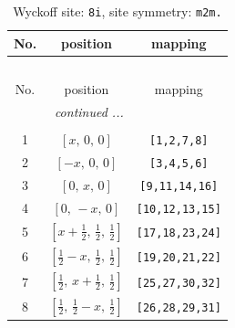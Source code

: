 \documentclass[fleqn,8pt]{jsarticle}
\begin{document}
\begin{longtable}{ccc}
\caption{Wyckoff site: {\tt 8i}, site symmetry: {\tt m2m.}}
 \\
 \hline \hline
No. & position & mapping \\ \hline \endfirsthead

\multicolumn{2}{l}{\tablename\ \thetable{}} \\
 \hline \hline
No. & position & mapping \\ \hline \endhead

 \hline \hline
\multicolumn{2}{r}{\footnotesize\it continued ...} \\ \endfoot

 \hline \hline
\multicolumn{2}{r}{} \\ \endlastfoot

1 & $\left[ x,\, 0,\, 0 \right]$ & {\tt [1,2,7,8]} \\ \hline
2 & $\left[ - x,\, 0,\, 0 \right]$ & {\tt [3,4,5,6]} \\ \hline
3 & $\left[ 0,\, x,\, 0 \right]$ & {\tt [9,11,14,16]} \\ \hline
4 & $\left[ 0,\, - x,\, 0 \right]$ & {\tt [10,12,13,15]} \\ \hline
5 & $\left[ x + \frac{1}{2},\, \frac{1}{2},\, \frac{1}{2} \right]$ & {\tt [17,18,23,24]} \\ \hline
6 & $\left[ \frac{1}{2} - x,\, \frac{1}{2},\, \frac{1}{2} \right]$ & {\tt [19,20,21,22]} \\ \hline
7 & $\left[ \frac{1}{2},\, x + \frac{1}{2},\, \frac{1}{2} \right]$ & {\tt [25,27,30,32]} \\ \hline
8 & $\left[ \frac{1}{2},\, \frac{1}{2} - x,\, \frac{1}{2} \right]$ & {\tt [26,28,29,31]} \\
\end{longtable}
\renewcommand{\arraystretch}{1.2}
\end{document}
